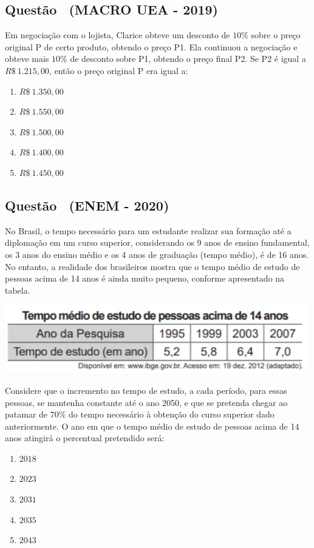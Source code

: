 \documentclass[12pt]{article}
\newcounter{questao}
\newcommand{\novaquestao}[1]{%
  \stepcounter{questao}%
  \subsection*{Questão \thequestao\ (#1)}%
}
\begin{document}
\begin{multicols}{2}
        \novaquestao{MACRO UEA - 2019}
            Em negociação com o lojista, Clarice obteve um desconto de $10\%$ sobre o preço original P de certo produto, obtendo o preço P1. Ela continuou a negociação e obteve mais $10\%$ de desconto sobre P1, obtendo o preço final P2. Se P2  é igual a $R\$\ 1.215,00$, então o preço original P era igual a:

            \begin{enumerate}[label=(\alph*), noitemsep]
                \item $R\$\ 1.350,00$
                \item $R\$\ 1.550,00$
                \item $R\$\ 1.500,00$
                \item $R\$\ 1.400,00$
                \item $R\$\ 1.450,00$
            \end{enumerate}

        \novaquestao{ENEM - 2020}
            No Brasil, o tempo necessário para um estudante realizar sua formação até a diplomação em um curso superior, considerando os 9 anos de ensino fundamental, os 3 anos do ensino médio e os 4 anos de graduação (tempo médio), é de 16 anos. No entanto, a realidade dos brasileiros mostra que o tempo médio de estudo de pessoas acima de 14 anos é ainda muito pequeno, conforme apresentado na tabela.

            \begin{center}
                \includegraphics[scale=0.5]{q16.png}
            \end{center}Considere que o incremento no tempo de estudo, a cada período, para essas pessoas, se mantenha constante até o ano 2050, e que se pretenda chegar ao patamar de $70\%$ do tempo necessário à obtenção do curso superior dado anteriormente. O ano em que o tempo médio de estudo de pessoas acima de 14 anos atingirá o percentual pretendido será:

            \begin{enumerate}[label=(\alph*), noitemsep]
                \item $2018$
                \item $2023$
                \item $2031$
                \item $2035$
                \item $2043$
            \end{enumerate}


\end{multicols}
\end{document}
